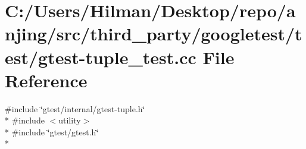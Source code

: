\hypertarget{gtest-tuple__test_8cc}{}\section{C\+:/\+Users/\+Hilman/\+Desktop/repo/anjing/src/third\+\_\+party/googletest/test/gtest-\/tuple\+\_\+test.cc File Reference}
\label{gtest-tuple__test_8cc}
{\ttfamily \#include \char`\"{}gtest/internal/gtest-\/tuple.\+h\char`\"{}}\\*
{\ttfamily \#include $<$utility$>$}\\*
{\ttfamily \#include \char`\"{}gtest/gtest.\+h\char`\"{}}\\*
